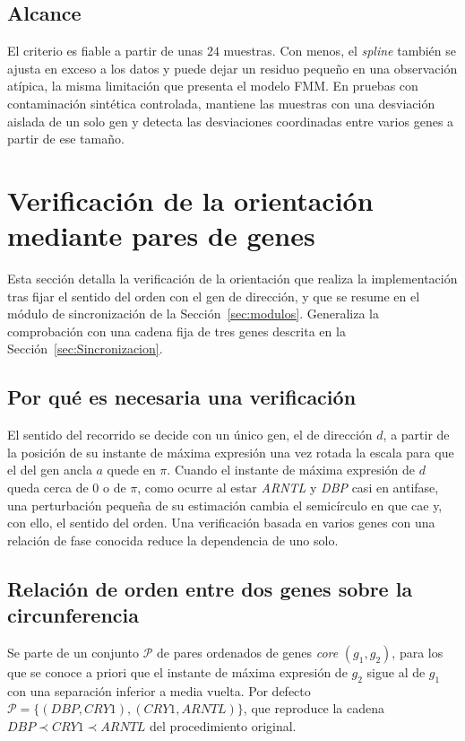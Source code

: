 \documentclass[12pt, a4paper]{report}
\begin{document}
\subsection{Alcance}

El criterio es fiable a partir de unas \(24\) muestras. Con menos, el \textit{spline} también se ajusta en exceso a los datos y puede dejar un residuo pequeño en una observación atípica, la misma limitación que presenta el modelo FMM. En pruebas con contaminación sintética controlada, mantiene las muestras con una desviación aislada de un solo gen y detecta las desviaciones coordinadas entre varios genes a partir de ese tamaño.

\section{Verificación de la orientación mediante pares de genes}
\label{sec:SenoPares}

Esta sección detalla la verificación de la orientación que realiza la implementación tras fijar el sentido del orden con el gen de dirección, y que se resume en el módulo de sincronización de la Sección~\ref{sec:modulos}. Generaliza la comprobación con una cadena fija de tres genes descrita en la Sección~\ref{sec:Sincronizacion}.

\subsection{Por qué es necesaria una verificación}

El sentido del recorrido se decide con un único gen, el de dirección \(d\), a partir de la posición de su instante de máxima expresión una vez rotada la escala para que el del gen ancla \(a\) quede en \(\pi\). Cuando el instante de máxima expresión de \(d\) queda cerca de \(0\) o de \(\pi\), como ocurre al estar \textit{ARNTL} y \textit{DBP} casi en antifase, una perturbación pequeña de su estimación cambia el semicírculo en que cae y, con ello, el sentido del orden. Una verificación basada en varios genes con una relación de fase conocida reduce la dependencia de uno solo.

\subsection{Relación de orden entre dos genes sobre la circunferencia}

Se parte de un conjunto \(\mathcal{P}\) de pares ordenados de genes \textit{core} \((g_1,g_2)\), para los que se conoce a priori que el instante de máxima expresión de \(g_2\) sigue al de \(g_1\) con una separación inferior a media vuelta. Por defecto \(\mathcal{P}=\{(\textit{DBP},\textit{CRY1}),(\textit{CRY1},\textit{ARNTL})\}\), que reproduce la cadena \(\textit{DBP}\prec\textit{CRY1}\prec\textit{ARNTL}\) del procedimiento original.
\end{document}

